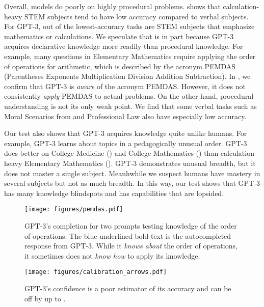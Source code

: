 \documentclass{article} \usepackage{iclr2021_conference, times}
\begin{document}
Overall, models do poorly on highly procedural problems.
 shows that calculation-heavy STEM subjects tend to have low accuracy compared to verbal subjects.
For GPT-3,  out of the  lowest-accuracy tasks are STEM subjects that emphasize mathematics or calculations.
We speculate that is in part because GPT-3 acquires declarative knowledge more readily than procedural knowledge. For example, many questions in Elementary Mathematics require applying the order of operations for arithmetic, which is described by the acronym PEMDAS (Parentheses Exponents Multiplication Division Addition Subtraction). In , we confirm that GPT-3 is \emph{aware} of the acronym PEMDAS. However, it does not consistently \emph{apply} PEMDAS to actual problems. 
On the other hand, procedural understanding is not its only weak point. We find that some verbal tasks such as Moral Scenarios from \cite{hendrycks2020ethicsdataset} and Professional Law also have especially low accuracy.



Our test also shows that GPT-3 acquires knowledge quite unlike humans. For example, GPT-3 learns about topics in a pedagogically unusual order.
GPT-3 does better on College Medicine () and College Mathematics () than calculation-heavy Elementary Mathematics (). GPT-3 demonstrates unusual breadth, but it does not master a single subject. Meanhwhile we suspect humans have mastery in several subjects but not as much breadth. In this way, our test shows that GPT-3 has many knowledge blindspots and has capabilities that are lopsided.








\begin{figure}
\vspace{-20pt}
\begin{minipage}{.5\textwidth}
\centering
\texttt{[image: figures/pemdas.pdf]}
\caption{GPT-3's completion for two prompts testing knowledge of the order of operations.
The \textcolor{rightblue}{blue} underlined bold text is the autocompleted response from GPT-3.
While it \emph{knows about} the order of operations, it sometimes does not \emph{know how} to apply its knowledge.}\label{fig:pemdas}
\end{minipage}\begin{minipage}{.5\textwidth}
\centering
\texttt{[image: figures/calibration\_arrows.pdf]}
\caption{
GPT-3's confidence is a poor estimator of its accuracy and can be off by up to .
}\label{fig:calibration}
\end{minipage}
\vspace{-15pt}
\end{figure}
\end{document}
